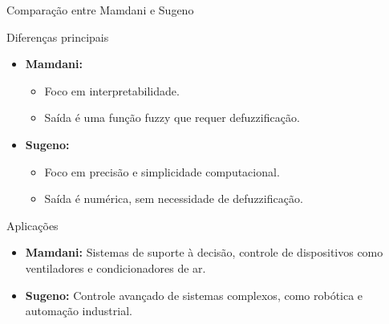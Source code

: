 \documentclass{beamer}
\begin{document}
\begin{frame}{Comparação entre Mamdani e Sugeno}
    \begin{block}{Diferenças principais}
        \begin{itemize}
            \item \textbf{Mamdani:}
                \begin{itemize}
                    \item Foco em interpretabilidade.
                    \item Saída é uma função fuzzy que requer defuzzificação.
                \end{itemize}
            \item \textbf{Sugeno:}
                \begin{itemize}
                    \item Foco em precisão e simplicidade computacional.
                    \item Saída é numérica, sem necessidade de defuzzificação.
                \end{itemize}
        \end{itemize}
    \end{block}
    \begin{block}{Aplicações}
        \begin{itemize}
            \item \textbf{Mamdani:} Sistemas de suporte à decisão, controle de dispositivos como ventiladores e condicionadores de ar.
            \item \textbf{Sugeno:} Controle avançado de sistemas complexos, como robótica e automação industrial.
        \end{itemize}
    \end{block}
\end{frame}
\end{document}
